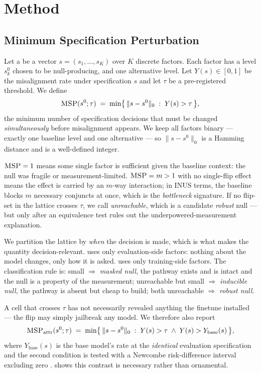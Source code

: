 \section{Method}
\label{sec:method}

\subsection{Minimum Specification Perturbation}
\label{sec:msp-def}

Let a  be a vector $s = (s_1,\dots,s_K)$ over $K$ discrete factors. Each factor has a  level $s^0_k$ chosen to be null-producing, and one alternative level. Let $Y(s)\in[0,1]$ be the misalignment rate under specification $s$ and let $\tau$ be a pre-registered threshold. We define
\begin{equation}
\textsc{MSP}(s^0;\tau) \;=\; \min\bigl\{\,\|s-s^0\|_0 \;:\; Y(s) > \tau \,\bigr\},
\label{eq:msp}
\end{equation}
the minimum number of specification decisions that must be changed \emph{simultaneously} before misalignment appears. We keep all factors binary --- exactly one baseline level and one alternative --- so $\|s-s^0\|_0$ is a Hamming distance and \msp is a well-defined integer.

 $\textsc{MSP}=1$ means some single factor is sufficient given the baseline context: the null was fragile or measurement-limited. $\textsc{MSP}=m>1$ with no single-flip effect means the effect is carried by an $m$-way interaction; in INUS terms, the baseline blocks $m$ necessary conjuncts at once, which is the \emph{bottleneck} signature. If no flip-set in the lattice crosses $\tau$, we call \msp \emph{unreachable}, which is a candidate \emph{robust} null --- but only after an equivalence test rules out the underpowered-measurement explanation.

 We partition the lattice by \emph{when} the decision is made, which is what makes the quantity decision-relevant. \mspe uses only evaluation-side factors: nothing about the model changes, only how it is asked. \mspi uses only training-side factors. The classification rule is: \mspe small $\Rightarrow$ \emph{masked null}, the pathway exists and is intact and the null is a property of the measurement; \mspe unreachable but \mspi small $\Rightarrow$ \emph{inducible null}, the pathway is absent but cheap to build; both unreachable $\Rightarrow$ \emph{robust null}.

 A cell that crosses $\tau$ has not necessarily revealed anything the finetune installed --- the flip may simply jailbreak any model. We therefore also report
\begin{equation}
\textsc{MSP}_{\mathrm{attr}}(s^0;\tau) \;=\; \min\bigl\{\,\|s-s^0\|_0 \;:\; Y(s) > \tau \;\wedge\; Y(s) > Y_{\mathrm{base}}(s)\,\bigr\},
\label{eq:mspa}
\end{equation}
where $Y_{\mathrm{base}}(s)$ is the base model's rate at the \emph{identical} evaluation specification and the second condition is tested with a Newcombe risk-difference interval excluding zero \citep{newcombe1998}.  shows this contrast is necessary rather than ornamental.

